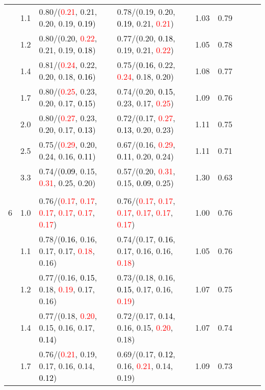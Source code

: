 \documentclass[10pt,a4paper]{report}
\begin{document}
\begin{table}[!htbp]
\begin{center}
{\begin{tabular}{ccllccccc}
			&1.1&0.80/(\textcolor{red}{0.21}, 0.21, 0.20, 0.19, \textcolor{black}{0.19})&0.78/(0.19, 0.20, \textcolor{black}{0.19}, 0.21, \textcolor{red}{0.21})&1.03&0.79\\
			&1.2&0.80/(0.20, \textcolor{red}{0.22}, 0.21, 0.19, \textcolor{black}{0.18})&0.77/(0.20, \textcolor{black}{0.18}, 0.19, 0.21, \textcolor{red}{0.22})&1.05&0.78\\
			&1.4&0.81/(\textcolor{red}{0.24}, 0.22, 0.20, 0.18, \textcolor{black}{0.16})&0.75/(\textcolor{black}{0.16}, 0.22, \textcolor{red}{0.24}, 0.18, 0.20)&1.08&0.77\\
			&1.7&0.80/(\textcolor{red}{0.25}, 0.23, 0.20, 0.17, \textcolor{black}{0.15})&0.74/(0.20, \textcolor{black}{0.15}, 0.23, 0.17, \textcolor{red}{0.25})&1.09&0.76\\
			&2.0&0.80/(\textcolor{red}{0.27}, 0.23, 0.20, 0.17, \textcolor{black}{0.13})&0.72/(0.17, \textcolor{red}{0.27}, \textcolor{black}{0.13}, 0.20, 0.23)&1.11&0.75\\
			&2.5&0.75/(\textcolor{red}{0.29}, 0.20, 0.24, 0.16, \textcolor{black}{0.11})&0.67/(0.16, \textcolor{red}{0.29}, \textcolor{black}{0.11}, 0.20, 0.24)&1.11&0.71\\
			&3.3&0.74/(\textcolor{black}{0.09}, 0.15, \textcolor{red}{0.31}, 0.25, 0.20)&0.57/(0.20, \textcolor{red}{0.31}, 0.15, \textcolor{black}{0.09}, 0.25)&1.30&0.63\\
			&&&&\\
			6			&1.0&0.76/(\textcolor{red}{0.17}, \textcolor{red}{0.17}, \textcolor{red}{0.17}, \textcolor{red}{0.17}, \textcolor{red}{0.17}, \textcolor{red}{0.17})&0.76/(\textcolor{red}{0.17}, \textcolor{red}{0.17}, \textcolor{red}{0.17}, \textcolor{red}{0.17}, \textcolor{red}{0.17}, \textcolor{red}{0.17})&1.00&0.76\\
			&1.1&0.78/(\textcolor{black}{0.16}, 0.16, 0.17, 0.17, \textcolor{red}{0.18}, 0.16)&0.74/(0.17, \textcolor{black}{0.16}, 0.17, 0.16, 0.16, \textcolor{red}{0.18})&1.05&0.76\\
			&1.2&0.77/(0.16, \textcolor{black}{0.15}, 0.18, \textcolor{red}{0.19}, 0.17, 0.16)&0.73/(0.18, 0.16, \textcolor{black}{0.15}, 0.17, 0.16, \textcolor{red}{0.19})&1.07&0.75\\
			&1.4&0.77/(0.18, \textcolor{red}{0.20}, 0.15, 0.16, 0.17, \textcolor{black}{0.14})&0.72/(0.17, \textcolor{black}{0.14}, 0.16, 0.15, \textcolor{red}{0.20}, 0.18)&1.07&0.74\\
			&1.7&0.76/(\textcolor{red}{0.21}, 0.19, 0.17, 0.16, 0.14, \textcolor{black}{0.12})&0.69/(0.17, \textcolor{black}{0.12}, 0.16, \textcolor{red}{0.21}, 0.14, 0.19)&1.09&0.73\\

\end{tabular}}
\end{center}
\end{table}
\end{document}
